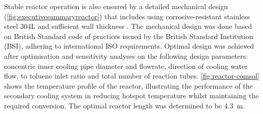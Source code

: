 

Stable reactor operation is also ensured by a detailed mechanical design (\cref{fig:executivesummaryreactor}) that includes using corrosive-resistant stainless steel 304L and sufficient wall thickness \cite{cm_selection_nodate}. The mechanical design was done based on British Standard code of practices issued by the British Standard Institution (BSI), adhering to international ISO requirements. Optimal design was achieved after optimisation and sensitivity analyses on the following design parameters: concentric inner cooling pipe diameter and flowrate, direction of cooling water flow,  to toluene inlet ratio and total number of reaction tubes. \cref{fig:reactor-comsol} shows the temperature profile of the reactor, illustrating the performance of the secondary cooling system in reducing hotspot temperature whilst maintaining the required conversion. The optimal reactor length was determined to be \SI{4.3}{\m}.  %


